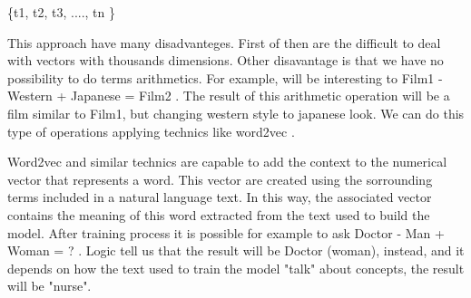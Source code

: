 \documentclass[letterpaper]{article}
\begin{document}
   \{t1, t2, t3, ...., tn \}    
   
This approach have many disadvanteges. First of then are the difficult to deal with vectors with thousands dimensions. Other disavantage is that we have no possibility to do terms arithmetics. For example, will be interesting to Film1 - Western + Japanese = Film2 . The result of this arithmetic operation will be a film similar to Film1, but changing western style to japanese look. We can do this type of operations applying technics like word2vec \cite{mikolov2013}.  

Word2vec and similar technics are capable to add the context to the numerical vector that represents a word. This vector are created using the sorrounding terms included in a natural language text. In this way, the associated vector contains the meaning of this word extracted from the text used to build the model. After training process it is possible for example to ask Doctor - Man + Woman = ? . Logic tell us that the result will be Doctor (woman), instead, and it depends on how the text used to train the model "talk" about concepts, the result will be "nurse".  
   






\end{document}
